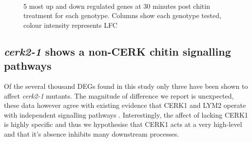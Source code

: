 \documentclass[../main.tex]{subfiles}
\begin{document}
\begin{figure}[!ht]
  \centering
  \\
  \caption{5 most up and down regulated genes at 30 minutes post chitin
    treatment for each genotype. Columns show each genotype tested, colour intensity represents LFC}
  \label{fig:DEG5}
\end{figure}


\subsection{\textit{cerk2-1} shows a non-CERK chitin signalling pathways}

Of the several thousand DEGs found in this study only three have been shown to
affect \textit{cerk2-1} mutants. The magnitude of difference we report is
unexpected, these data however agree with existing evidence that CERK1 and LYM2
operate with independent signalling pathways \cite{Faulkner2013,
  miyaCERK1LysMReceptor2007, narusakaPresenceLYM2Dependent2013}. Interestingly,
the affect of lacking CERK1 is highly specific and thus we hypothesise that
CERK1 acts at a very high-level and that it's absence inhibits many downstream
processes. 
\end{document}
